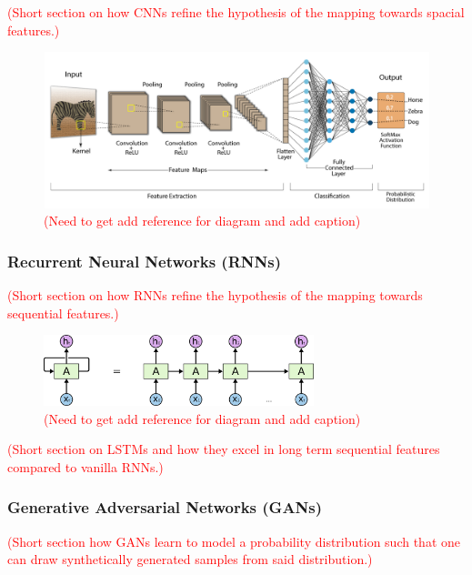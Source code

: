 \textcolor{red}{(Short section on how CNNs refine the hypothesis of the
    mapping towards spacial features.)}

\begin{figure}[h]
    \centering
    \includegraphics[width=\textwidth]{graphics/cnn_banner.png}
    \caption{\textcolor{red}{(Need to get add reference for diagram and add caption)}}
\end{figure}

\subsubsection{Recurrent Neural Networks (RNNs)\label{ssec:rnn}}

\textcolor{red}{(Short section on how RNNs refine the hypothesis of the
    mapping towards sequential features.)}

\begin{figure}[h]
    \centering
    \includegraphics[width=0.7\textwidth]{graphics/RNN-unrolled.png}
    \caption{\textcolor{red}{(Need to get add reference for diagram and add caption)}}
\end{figure}

\textcolor{red}{(Short section on LSTMs and how they excel in long term
    sequential features compared to vanilla RNNs.)}

\subsubsection{Generative Adversarial Networks (GANs)\label{ssec:gan}}

\textcolor{red}{(Short section how GANs learn to model a probability
    distribution such that one can draw synthetically generated samples
    from said distribution.)}

